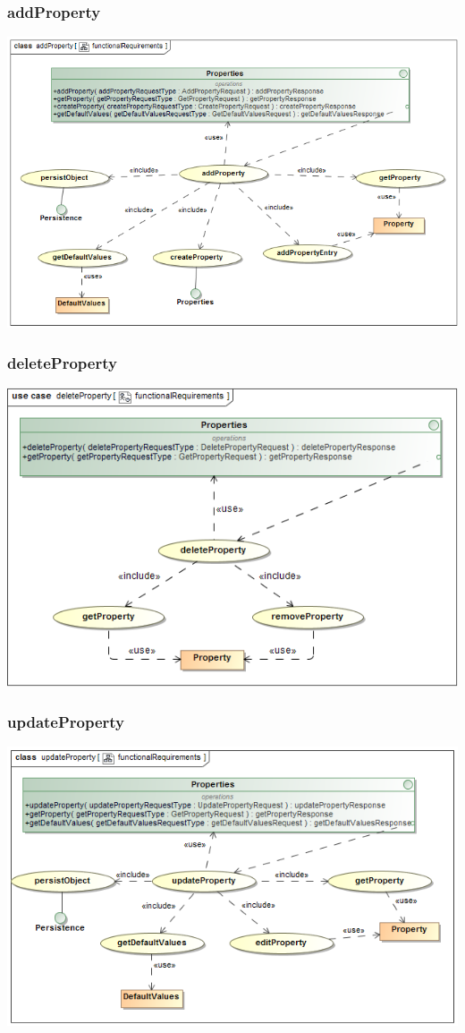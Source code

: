 \documentclass[a4paper,12pt]{article}
\begin{document}
\subsubsection{addProperty}
\includegraphics[width=1\textwidth]{./Images/requiredFunctionality/addProperty.png}
\subsubsection{deleteProperty}
\includegraphics[width=1\textwidth]{./Images/requiredFunctionality/deleteProperty.png}
\subsubsection{updateProperty}
\includegraphics[width=1\textwidth]{./Images/requiredFunctionality/updateProperty.png}
\end{document}
